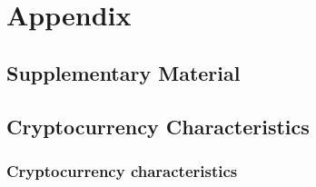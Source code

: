 \documentclass[
  12pt,
  a4paper,
  openany]{scrbook}
\begin{document}
\cleardoublepage
{}
{}
\appendix

\chapter{Appendix}\label{appendix}

\section{Supplementary Material}\label{sec-app_material}

\section{Cryptocurrency Characteristics}\label{sec-app_characteristics}

\subsection{Cryptocurrency
characteristics}\label{cryptocurrency-characteristics}


\backmatter
\end{document}
